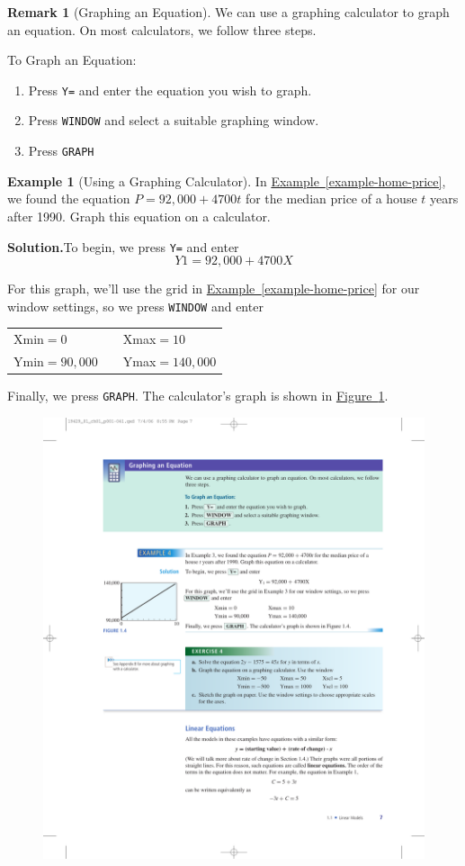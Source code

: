 \documentclass[10pt,]{book}
\theoremstyle{plain}
\theoremstyle{definition}
\newtheorem{remark}[theorem]{Remark}
\theoremstyle{definition}
\newtheorem{example}[theorem]{Example}
\theoremstyle{definition}
\numberwithin{equation}{part}
\begin{document}
\begin{remark}[Graphing an Equation]\label{remark-1}
We can use a graphing calculator to graph an equation. On most calculators, we follow three steps.%
\par
To Graph an Equation:%
\leavevmode%
\begin{enumerate}
\item\hypertarget{li-36}{}Press \lstinline?Y=? and enter the equation you wish to graph.%
\item\hypertarget{li-37}{}Press \lstinline?WINDOW? and select a suitable graphing window.%
\item\hypertarget{li-38}{}Press \lstinline?GRAPH?%
\end{enumerate}
\end{remark}
\begin{example}[Using a Graphing Calculator]\label{graphing-calculator}
In \hyperref[example-home-price]{Example~\ref{example-home-price}}, we found the equation \(P = 92,000 + 4700t\) for the median price of a house \(t\) years after 1990. Graph this equation on a calculator.%
\par\medskip\noindent%
\textbf{Solution.}\quad To begin, we press \lstinline?Y=? and enter%
\begin{equation*}
Y1 = 92,000 + 4700X
\end{equation*}
%
\par
For this graph, we’ll use the grid in \hyperref[example-home-price]{Example~\ref{example-home-price}} for our window settings, so we press \lstinline?WINDOW? and enter%
\begin{table}
\centering
\begin{tabular}{lll}
Xmin\(=0\)&&Xmax\(=10\)\tabularnewline[0pt]
Ymin\(=90,000\)&&Ymax\(=140,000\)
\end{tabular}
\end{table}
Finally, we press \lstinline?GRAPH?. The calculator's graph is shown in \hyperref[fig-GC-house-price]{Figure~\ref{fig-GC-house-price}}. \begin{figure}
\centering
\includegraphics[width=0.5\linewidth]{images/fig-GC-house-price}
\caption{\label{fig-GC-house-price}}
\end{figure}
%
\end{example}
\end{document}
